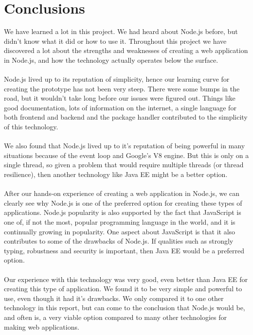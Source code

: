 \section{Conclusions}

We have learned a lot in this project. We had heard about Node.js before, but didn't know what it did or how to use it. Throughout this project we have discovered a lot about the strengths and weaknesses of creating a web application in Node.js, and how the technology actually operates below the surface.
\\\\
Node.js lived up to its reputation of simplicity, hence our learning curve for creating the prototype has not been very steep. There were some bumps in the road, but it wouldn't take long before our issues were figured out. Things like good documentation, lots of information on the internet, a single language for both frontend and backend and the package handler contributed to the simplicity of this technology. 
\\\\
We also found that Node.js lived up to it's reputation of being powerful in many situations because of the event loop and Google's V8 engine. But this is only on a single thread, so given a problem that would require multiple threads (or thread resilience), then another technology like Java EE might be a better option.  
\\\\
After our hands-on experience of creating a web application in Node.js, we can clearly see why Node.js is one of the preferred option for creating these types of applications. Node.js popularity is also supported by the fact that JavaScript is one of, if not the most, popular programming language in the world, and it is continually growing in popularity. One aspect about JavaScript is that it also contributes to some of the drawbacks of Node.js. If qualities such as strongly typing, robustness and security is important, then Java EE would be a preferred option.
\\\\
Our experience with this technology was very good, even better than Java EE for creating this type of application. We found it to be very simple and powerful to use, even though it had it's drawbacks. We only compared it to one other technology in this report, but can come to the conclusion that Node.js would be, and often is, a very viable option compared to many other technologies for making web applications. 
